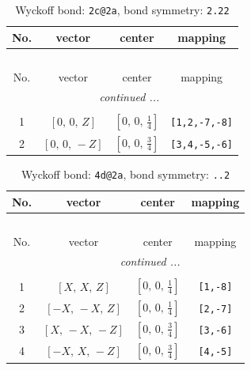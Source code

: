 \documentclass[fleqn,8pt]{jsarticle}
\begin{document}
\renewcommand{\arraystretch}{1.2}
\begin{longtable}{cccc}
\caption{Wyckoff bond: {\tt 2c@2a}, bond symmetry: {\tt 2.22}}
 \\
 \hline \hline
No. & vector & center & mapping \\ \hline \endfirsthead

\multicolumn{3}{l}{\tablename\ \thetable{}} \\
 \hline \hline
No. & vector & center & mapping \\ \hline \endhead

 \hline \hline
\multicolumn{3}{r}{\footnotesize\it continued ...} \\ \endfoot

 \hline \hline
\multicolumn{3}{r}{} \\ \endlastfoot

1 & $\left[ 0,\, 0,\, Z \right]$ & $\left[ 0,\, 0,\, \frac{1}{4} \right]$ & {\tt [1,2,-7,-8]} \\ \hline
2 & $\left[ 0,\, 0,\, - Z \right]$ & $\left[ 0,\, 0,\, \frac{3}{4} \right]$ & {\tt [3,4,-5,-6]} \\
\end{longtable}
\renewcommand{\arraystretch}{1.2}
\begin{longtable}{cccc}
\caption{Wyckoff bond: {\tt 4d@2a}, bond symmetry: {\tt ..2}}
 \\
 \hline \hline
No. & vector & center & mapping \\ \hline \endfirsthead

\multicolumn{3}{l}{\tablename\ \thetable{}} \\
 \hline \hline
No. & vector & center & mapping \\ \hline \endhead

 \hline \hline
\multicolumn{3}{r}{\footnotesize\it continued ...} \\ \endfoot

 \hline \hline
\multicolumn{3}{r}{} \\ \endlastfoot

1 & $\left[ X,\, X,\, Z \right]$ & $\left[ 0,\, 0,\, \frac{1}{4} \right]$ & {\tt [1,-8]} \\ \hline
2 & $\left[ - X,\, - X,\, Z \right]$ & $\left[ 0,\, 0,\, \frac{1}{4} \right]$ & {\tt [2,-7]} \\ \hline
3 & $\left[ X,\, - X,\, - Z \right]$ & $\left[ 0,\, 0,\, \frac{3}{4} \right]$ & {\tt [3,-6]} \\ \hline
4 & $\left[ - X,\, X,\, - Z \right]$ & $\left[ 0,\, 0,\, \frac{3}{4} \right]$ & {\tt [4,-5]} \\
\end{longtable}
\end{document}
